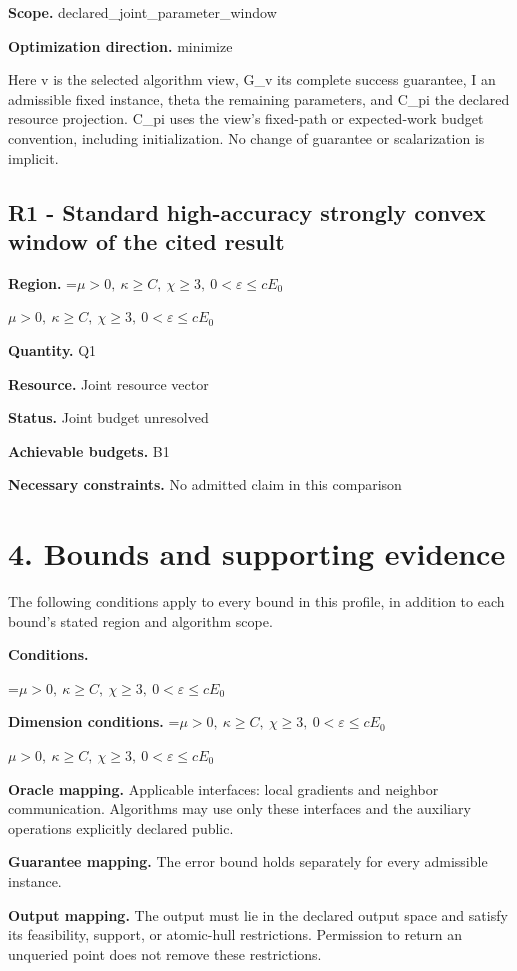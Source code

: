 \documentclass[10pt,a4paper]{article}
\newcommand{\AtlasMath}[1]{\par\begingroup\centering\setbox0=\hbox{$\displaystyle #1$}\ifdim\wd0>1.4\linewidth\typeout{ATLAS WIDE FORMULA: \the\wd0}\fi\ifdim\wd0>\linewidth\resizebox{\linewidth}{!}{\box0}\else\box0\fi\par\endgroup}
\newcommand{\AtlasInlineMath}[1]{\begingroup\setbox0=\hbox{$#1$}\ifdim\wd0>.4\linewidth\endgroup\AtlasMath{#1}\else\endgroup$#1$\fi}
\begin{document}
\textbf{Scope.} declared\_joint\_parameter\_window

\textbf{Optimization direction.} minimize

Here v is the selected algorithm view, G\_v its complete success guarantee, I an admissible fixed instance, theta the remaining parameters, and C\_pi the declared resource projection. C\_pi uses the view's fixed-path or expected-work budget convention, including initialization. No change of guarantee or scalarization is implicit.

\subsection{R1 - Standard high-accuracy strongly convex window of the cited result}
\textbf{Region.} \AtlasInlineMath{\mu>0,\ \kappa\ge C,\ \chi\ge3,\ 0<\varepsilon\le cE_0}

\textbf{Quantity.} Q1

\textbf{Resource.} Joint resource vector

\textbf{Status.} Joint budget unresolved

\textbf{Achievable budgets.} B1

\textbf{Necessary constraints.} No admitted claim in this comparison

\section{4. Bounds and supporting evidence}
The following conditions apply to every bound in this profile, in addition to each bound's stated region and algorithm scope.

\textbf{Conditions.} 
\AtlasMath{\mu>0,\ \kappa\ge C,\ \chi\ge3,\ 0<\varepsilon\le cE_0}


\textbf{Dimension conditions.} \AtlasInlineMath{\mu>0,\ \kappa\ge C,\ \chi\ge3,\ 0<\varepsilon\le cE_0}

\textbf{Oracle mapping.} Applicable interfaces: local gradients and neighbor communication. Algorithms may use only these interfaces and the auxiliary operations explicitly declared public.

\textbf{Guarantee mapping.} The error bound holds separately for every admissible instance.

\textbf{Output mapping.} The output must lie in the declared output space and satisfy its feasibility, support, or atomic-hull restrictions. Permission to return an unqueried point does not remove these restrictions.
\end{document}
